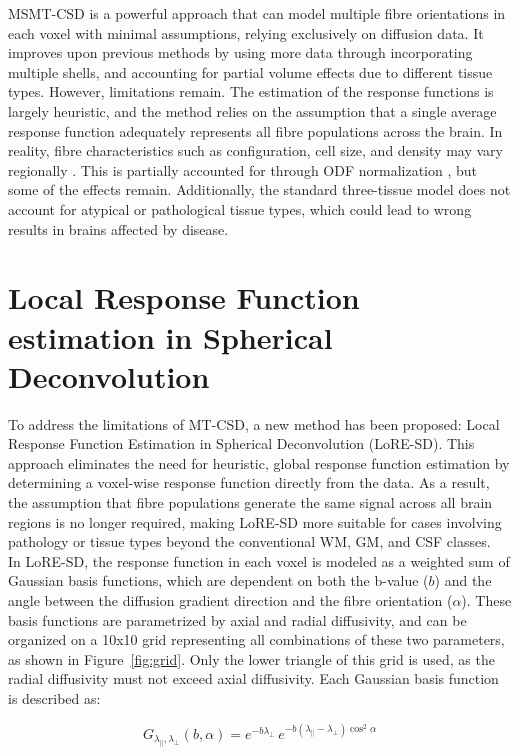 MSMT-CSD is a powerful approach that can model multiple fibre orientations in each voxel with minimal assumptions, relying exclusively on diffusion data. It improves upon previous methods by using more data through incorporating multiple shells, and accounting for partial volume effects due to different tissue types.
However, limitations remain. The estimation of the response functions is largely heuristic, and the method relies on the assumption that a single average response function adequately represents all fibre populations across the brain. In reality, fibre characteristics such as configuration, cell size, and density may vary regionally \cite{Seunarine2013}. This is partially accounted for through ODF normalization \cite{Dhollander2021}, but some of the effects remain. Additionally, the standard three-tissue model does not account for atypical or pathological tissue types, which could lead to wrong results in brains affected by disease.

\section{Local Response Function estimation in Spherical Deconvolution}

To address the limitations of MT-CSD, a new method has been proposed: Local Response Function Estimation in Spherical Deconvolution (LoRE-SD). This approach eliminates the need for heuristic, global response function estimation by determining a voxel-wise response function directly from the data. As a result, the assumption that fibre populations generate the same signal across all brain regions is no longer required, making LoRE-SD more suitable for cases involving pathology or tissue types beyond the conventional WM, GM, and CSF classes.
\\In LoRE-SD, the response function in each voxel is modeled as a weighted sum of Gaussian basis functions, which are dependent on both the b-value ($b$) and the angle between the diffusion gradient direction and the fibre orientation ($\alpha$). These basis functions are parametrized by axial and radial diffusivity, and can be organized on a 10x10 grid representing all combinations of these two parameters, as shown in Figure~\ref{fig:grid}. Only the lower triangle of this grid is used, as the radial diffusivity must not exceed axial diffusivity.
Each Gaussian basis function is described as:

\begin{equation}
G_{\lambda_{\parallel}, \lambda_{\perp}}(b, \alpha) = 
e^{-b \lambda_{\perp}} \, 
e^{-b (\lambda_{\parallel} - \lambda_{\perp}) \cos^2 \alpha}
\end{equation}

